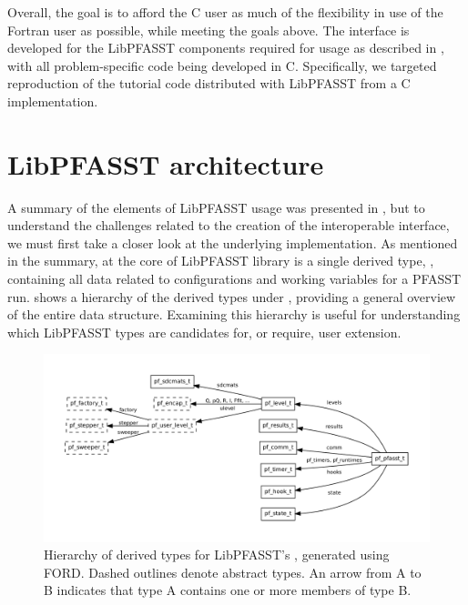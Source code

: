Overall, the goal is to afford the C user as much of the flexibility in use of the Fortran user as possible, while meeting the goals above. The interface is developed for the LibPFASST components required for usage as described in , with all problem-specific code being developed in C. Specifically, we targeted reproduction of the tutorial code distributed with LibPFASST from a C implementation.

\section{LibPFASST architecture} \label{sec:libpfasst_arch}

A summary of the elements of LibPFASST usage was presented in , but to understand the challenges related to the creation of the interoperable interface, we must first take a closer look at the underlying implementation. As mentioned in the summary, at the core of LibPFASST library is a single derived type, , containing all data related to configurations and working variables for a PFASST run.  shows a hierarchy of the derived types under , providing a general overview of the entire data structure. Examining this hierarchy is useful for understanding which LibPFASST types are candidates for, or require, user extension. 

\begin{figure}[ht]
  \centering
  \includegraphics[width=\textwidth]{images/pf_pfasst_t.pdf}
  \caption{Hierarchy of derived types for LibPFASST's , generated using FORD\footnotemark. Dashed outlines denote abstract types. An arrow from A to B indicates that type A contains one or more members of type B.}
  \label{fig:libpfasst_types}
\end{figure}


